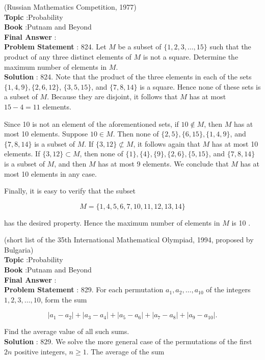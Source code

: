 \documentclass[10pt]{article}
\begin{document}
(Russian Mathematics Competition, 1977)
\\
\textbf{Topic} :Probability\\
\textbf{Book} :Putnam and Beyond\\
\textbf{Final Answer} :\\


\textbf{Problem Statement} :
824. Let $M$ be a subset of $\{1,2,3, \ldots, 15\}$ such that the product of any three distinct elements of $M$ is not a square. Determine the maximum number of elements in $M$.
\\
\textbf{Solution} :
824. Note that the product of the three elements in each of the sets $\{1,4,9\},\{2,6,12\}$, $\{3,5,15\}$, and $\{7,8,14\}$ is a square. Hence none of these sets is a subset of $M$. Because they are disjoint, it follows that $M$ has at most $15-4=11$ elements.

Since 10 is not an element of the aforementioned sets, if $10 \notin M$, then $M$ has at most 10 elements. Suppose $10 \in M$. Then none of $\{2,5\},\{6,15\},\{1,4,9\}$, and $\{7,8,14\}$ is a subset of $M$. If $\{3,12\} \not \subset M$, it follows again that $M$ has at most 10 elements. If $\{3,12\} \subset M$, then none of $\{1\},\{4\},\{9\},\{2,6\},\{5,15\}$, and $\{7,8,14\}$ is a subset of $M$, and then $M$ has at most 9 elements. We conclude that $M$ has at most 10 elements in any case.

Finally, it is easy to verify that the subset

$$
M=\{1,4,5,6,7,10,11,12,13,14\}
$$

has the desired property. Hence the maximum number of elements in $M$ is 10 .

(short list of the 35th International Mathematical Olympiad, 1994, proposed by Bulgaria)
\\
\textbf{Topic} :Probability\\
\textbf{Book} :Putnam and Beyond\\
\textbf{Final Answer} :\\


\textbf{Problem Statement} :
829. For each permutation $a_{1}, a_{2}, \ldots, a_{10}$ of the integers $1,2,3, \ldots, 10$, form the sum

$$
\left|a_{1}-a_{2}\right|+\left|a_{3}-a_{4}\right|+\left|a_{5}-a_{6}\right|+\left|a_{7}-a_{8}\right|+\left|a_{9}-a_{10}\right| .
$$

Find the average value of all such sums.
\\
\textbf{Solution} :
829. We solve the more general case of the permutations of the first $2 n$ positive integers, $n \geq 1$. The average of the sum
\end{document}
